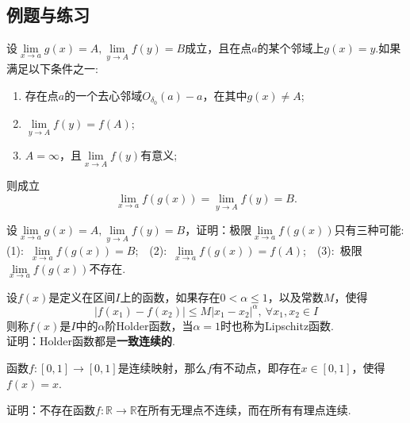 	\subsection{例题与练习}
	\begin{example}[函数极限的换元法]
		设$\lim\limits_{x\rightarrow a}g(x)=A,\lim\limits_{y\rightarrow A}f(y)=B$成立，且在点$a$的某个邻域上$g(x)=y$.如果满足以下条件之一:
		\begin{enumerate}
			\item 存在点$a$的一个去心邻域$O_{\delta_0}(a)-{a}$，在其中$g(x)\neq A$;
			\item $\lim\limits_{y\rightarrow A}f(y)= f(A)$;
			\item $A=\infty$，且$\lim\limits_{x\rightarrow A}f(y)$有意义;
		\end{enumerate}
		则成立$$\lim\limits_{x\rightarrow a}f(g(x))=\lim\limits_{y\rightarrow A}f(y)=B.$$
	\end{example}
	\begin{example}
		设$\lim\limits_{x\rightarrow a}g(x)=A,\lim\limits_{y\rightarrow A}f(y)=B$，证明：极限$\lim\limits_{x\rightarrow a}f(g(x))$只有三种可能:\\
		(1):\ $\lim\limits_{x\rightarrow a}f(g(x))=B$;\ \ (2):\ $\lim\limits_{x\rightarrow a}f(g(x))=f(A)$;\ \ (3):\ 极限$\lim\limits_{x\rightarrow a}f(g(x))$不存在.
	\end{example}
	\begin{example}
		设$f(x)$是定义在区间$I$上的函数，如果存在$0<\alpha\leq1$，以及常数$M$，使得$$|f(x_1)-f(x_2)|\leq M|x_1-x_2|^{\alpha},\ \forall x_1,x_2\in I$$
		则称$f(x)$是$I$中的$\alpha$阶Holder函数，当$\alpha=1$时也称为Lipschitz函数.\\
		证明：Holder函数都是\textbf{一致连续的}.
	\end{example}
	\begin{example}[Brouwer不动点定理]
		函数$f:\left[0,1\right]\rightarrow\left[0,1\right]$是连续映射，那么$f$有不动点，即存在$x\in\left[0,1\right]$，使得$f(x)=x$.
	\end{example}
	\begin{example}
		证明：不存在函数$f:\mathbb{R}\rightarrow\mathbb{R}$在所有无理点不连续，而在所有有理点连续.
	\end{example}

